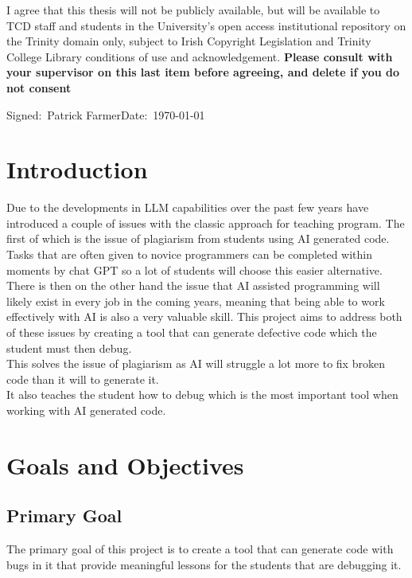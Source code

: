 \documentclass[12pt]{extarticle}
\begin{document}
\small I agree that this thesis will not be publicly available, but will be available to TCD staff and students in the University’s open access institutional repository on the Trinity domain only, subject to Irish Copyright Legislation and Trinity College Library conditions of use and acknowledgement.  \textbf{Please consult with your supervisor on this last item before agreeing, and delete if you do not consent}
\vspace{2cm}

\small Signed:~Patrick Farmer\hfill Date:~\today

\newpage
\tableofcontents

\newpage
\section{Introduction}

Due to the developments in LLM capabilities over the past few years have introduced a couple of issues with the classic approach for teaching program. The first of which is the issue of plagiarism from students using AI generated code. Tasks that are often given to novice programmers can be completed within moments by chat GPT so a lot of students will choose this easier alternative.\\
There is then on the other hand the issue that AI assisted programming will likely exist in every job in the coming years, meaning that being able to work effectively with AI is also a very valuable skill. This project aims to address both of these issues by creating a tool that can generate defective code which the student must then debug.\\
This solves the issue of plagiarism as AI will struggle a lot more to fix broken code than it will to generate it.\\
It also teaches the student how to debug which is the most important tool when working with AI generated code.

\section{Goals and Objectives}

\subsection{Primary Goal}

The primary goal of this project is to create a tool that can generate code with bugs in it that provide meaningful lessons for the students that are debugging it.
\end{document}
